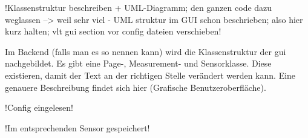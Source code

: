 !Klassenstruktur beschreiben + UML-Diagramm; den ganzen code dazu weglassen --> weil sehr viel - UML struktur im GUI schon beschrieben; also hier kurz halten; vlt gui section vor config dateien verschieben!

Im Backend (falls man es so nennen kann) wird die Klassenstruktur der \acs{gui} nachgebildet. Es gibt eine Page-, Measurement- und Sensorklasse. Diese existieren, damit der Text an der richtigen Stelle verändert werden kann. Eine genauere Beschreibung findet sich hier (Grafische Benutzeroberfläche). 

!Config eingelesen!

!Im entsprechenden Sensor gespeichert!